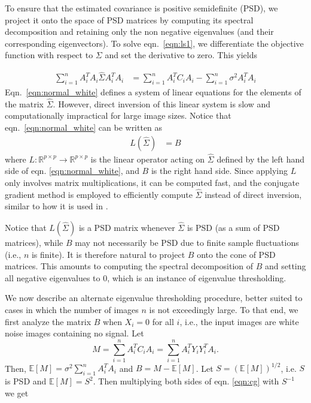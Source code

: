 To ensure that the estimated
covariance is positive semidefinite (PSD), we project it onto the space of 
PSD matrices by computing
its spectral decomposition and retaining only the non negative eigenvalues (and their corresponding eigenvectors).
To solve eqn.\ \ref{eqn:ls1},
we differentiate the objective function with respect to $\Sigma$ 
and set the derivative to zero. This yields

\begin{equation}
\begin{aligned}
\sum_{i=1}^n  A_i^T  A_i \hat \Sigma A_i^T A_i
&= \sum_{i=1}^n A_i^T C_i A_i - \sum_{i=1}^n \sigma^2 A_i^T A_i 
\end{aligned}
\label{eqn:normal_white}
\end{equation}
Eqn.\ \ref{eqn:normal_white} defines a system of linear equations for the elements of the matrix $\hat \Sigma$.
However, direct inversion of this linear system is slow and computationally impractical for large image sizes.
Notice that eqn.\ \ref{eqn:normal_white} can be written as 
\begin{equation}
\begin{aligned}
L(\hat\Sigma) 
&=  B 
\label{eqn:cg}
\end{aligned}
\end{equation}
where $L:\mathbb{R}^{p\times p} \to \mathbb{R}^{p\times p}$ is the linear operator acting on $\hat{\Sigma}$ defined by the left hand side of eqn. \ref{eqn:normal_white}, and $B$ is the right hand side.
Since applying $L$ only involves matrix multiplications, it can be computed fast, and
the conjugate gradient method is employed to efficiently compute $\hat \Sigma$ instead of direct inversion,
similar to how it is used in \cite{joakim}.

Notice that $L(\hat{\Sigma})$ is a PSD matrix whenever $\hat{\Sigma}$ is PSD (as 
a sum of PSD matrices), while $B$ may not necessarily be PSD due to finite 
sample fluctuations (i.e., $n$ is finite). It is therefore natural to project 
$B$ onto the cone of PSD matrices. This amounts to computing the spectral 
decomposition of $B$ and setting all negative eigenvalues to 0, which is an 
instance of eigenvalue thresholding.

We now describe an alternate eigenvalue thresholding procedure, better suited to 
cases in which the number of images $n$ is not exceedingly large. To that end, 
we first analyze the matrix $B$ when $X_i=0$ for all $i$, i.e., the input images 
are white noise images containing no signal. Let 
\begin{equation}
M = \sum_{i=1}^n A_i^T C_i A_i = \sum_{i=1}^n A_i^T Y_i Y_i^T A_i.
\end{equation}
Then, $\mathbb{E}[M] = \sigma^2 \sum_{i=1}^n A_i^T A_i$
and $B = M - \mathbb{E}[M]$. Let $S = (\mathbb{E}[M])^{1/2}$, i.e. 
$S$ is PSD and $\mathbb{E}[M]=S^2$.
Then multiplying both sides of eqn. \ref{eqn:cg} with $S^{-1}$ we get

